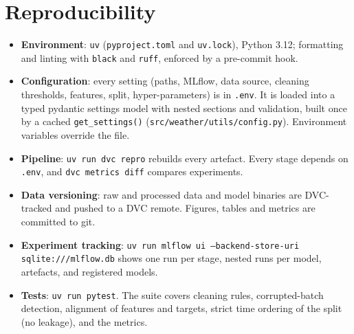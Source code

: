 \section{Reproducibility}
\begin{itemize}
  \item \textbf{Environment}: \texttt{uv} (\texttt{pyproject.toml} and \texttt{uv.lock}), Python 3.12;
        formatting and linting with \texttt{black} and \texttt{ruff}, enforced by a pre-commit hook.
  \item \textbf{Configuration}: every setting (paths, MLflow, data source, cleaning thresholds, features,
        split, hyper-parameters) is in \nolinkurl{.env}. It is loaded into a typed pydantic settings model with
        nested sections and validation, built once by a cached \texttt{get\_settings()}
        (\nolinkurl{src/weather/utils/config.py}). Environment variables override the file.
  \item \textbf{Pipeline}: \texttt{uv run dvc repro} rebuilds every artefact. Every stage depends on
        \nolinkurl{.env}, and \texttt{dvc metrics diff} compares experiments.
  \item \textbf{Data versioning}: raw and processed data and model binaries are DVC-tracked and pushed to a
        DVC remote. Figures, tables and metrics are committed to git.
  \item \textbf{Experiment tracking}: \texttt{uv run mlflow ui --backend-store-uri sqlite:///mlflow.db}
        shows one run per stage, nested runs per model, artefacts, and registered models.
  \item \textbf{Tests}: \texttt{uv run pytest}. The suite covers cleaning rules, corrupted-batch detection,
        alignment of features and targets, strict time ordering of the split (no leakage), and the metrics.
\end{itemize}
